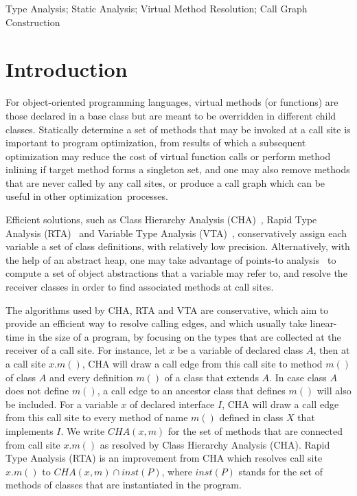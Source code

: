 \documentclass{fac}
\begin{document}
\begin{keywords}
Type Analysis; Static Analysis; Virtual Method Resolution; Call Graph Construction
\end{keywords}

\section{Introduction}\label{sec:introduction}
For object-oriented programming languages, virtual methods (or functions) are those declared in a base class but are meant to be overridden in different child classes. Statically determine a set of methods that may be invoked at a call site is important to program optimization, from results of which a subsequent optimization may reduce the cost of virtual function calls or perform method inlining if target method forms a singleton set, and one may also remove methods that are never called by any call sites, or produce a call graph which can be useful in other optimization~processes.

Efficient solutions, such as Class Hierarchy Analysis (CHA)~\cite{Dean1995,Fernandez1995}, Rapid Type Analysis (RTA)~\cite{Bacon1996} and Variable Type Analysis (VTA)~\cite{Sundaresan2000}, conservatively assign each variable a set of class definitions, with relatively low precision. Alternatively, with the help of an abstract heap, one may take advantage of points-to analysis~\cite{andersen94} to compute a set of object abstractions that a variable may refer to, and resolve the receiver classes in order to find associated methods at call sites.

The algorithms used by CHA, RTA and VTA are conservative, which aim to provide an efficient way to resolve calling edges, and which usually take linear-time in the size of a program, by focusing on the types that are collected at the receiver of a call site. For instance, let $x$ be a variable of declared class $A$, then at a call site $x.m()$, CHA will draw a call edge from this call site to method $m()$ of class $A$ and every definition $m()$ of a class that extends $A$. In case class $A$ does not define $m()$, a call edge to an ancestor class that defines $m()$ will also be included. For a variable $x$ of declared interface $I$, CHA will draw a call edge from this call site to every method of name $m()$ defined in class $X$ that implements $I$.
We write $CHA(x,m)$ for the set of methods that are connected from call site $x.m()$ as resolved by  Class Hierarchy Analysis (CHA).
Rapid Type Analysis (RTA) is an improvement from CHA which resolves call site $x.m()$ to $CHA(x,m)\cap inst(P)$, where $inst(P)$ stands for the set of methods of classes that are instantiated in the program.
\end{document}
